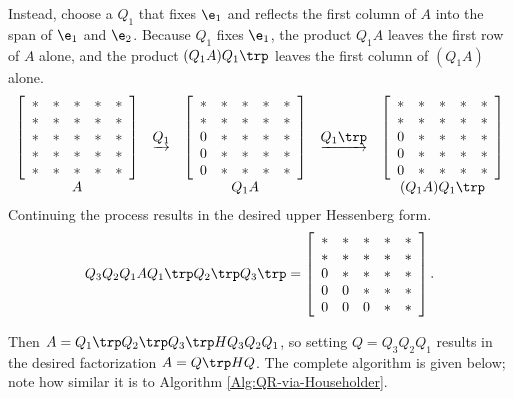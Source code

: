 Instead, choose a $Q_1$ that fixes $\e_1$ and reflects the first column of $A$ into the span of $\e_1$ and $\e_2$.
Because $Q_1$ fixes $\e_1$, the product $Q_1A$ leaves the first row of $A$ alone, and the product $(Q_1A)Q_1\trp$ leaves the first column of $(Q_1A)$ alone.
\[
\begin{array}{ccccc}
\left[\begin{array}{ccccc}
* & * & * & * & * \\
* & * & * & * & * \\
* & * & * & * & * \\
* & * & * & * & * \\
* & * & * & * & *
\end{array}\right]
&\underrightarrow{Q_1}&
\left[\begin{array}{ccccc}
* & * & * & * & * \\
* & * & * & * & * \\
0 & * & * & * & * \\
0 & * & * & * & * \\
0 & * & * & * & *
\end{array}\right]
&\underrightarrow{Q_1\trp }&
\left[\begin{array}{ccccc}
* & * & * & * & * \\
* & * & * & * & * \\
0 & * & * & * & * \\
0 & * & * & * & * \\
0 & * & * & * & *
\end{array}\right]
\\
A & & Q_1A & & (Q_1 A) Q_1\trp
\end{array}
\]
Continuing the process results in the desired upper Hessenberg form.
%
\begin{equation*}
Q_3 Q_2 Q_1 A Q_1\trp Q_2 \trp Q_3\trp =
\left[\begin{array}{ccccc}
* & * & * & * & * \\
* & * & * & * & * \\
0 & * & * & * & * \\
0 & 0 & * & * & * \\
0 & 0 & 0 & * & *
\end{array}\right].
\end{equation*}

Then $A = Q_1\trp Q_2\trp Q_3\trp H Q_3 Q_2 Q_1$, so setting $Q = Q_3 Q_2 Q_1$ results in the desired factorization $A = Q\trp H Q$.
The complete algorithm is given below; note how similar it is to Algorithm \ref{Alg:QR-via-Householder}.

